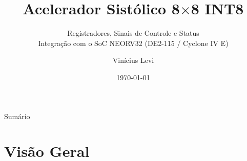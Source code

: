 \documentclass[aspectratio=169,10pt]{beamer}
\title[Acelerador Sistólico 8$\times$8 -- NEORV32]{Acelerador Sistólico 8$\times$8 INT8}
\subtitle{Registradores, Sinais de Controle e Status\\Integração com o SoC NEORV32 (DE2-115 / Cyclone IV E)}
\author{Vinícius Levi}
\date{\today}
\begin{document}
\begin{frame}
  \titlepage
\end{frame}

\begin{frame}{Sumário}
  \tableofcontents
\end{frame}

\section{Visão Geral}
\end{document}
